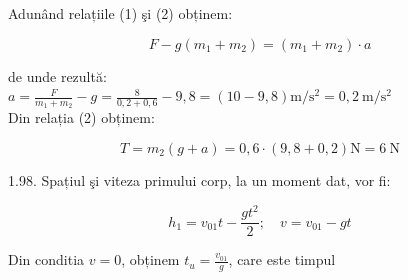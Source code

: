 \documentclass[10pt]{article}
\begin{document}
Adunând relațiile (1) şi (2) obținem:

$$
F-g\left(m_{1}+m_{2}\right)=\left(m_{1}+m_{2}\right) \cdot a
$$

de unde rezultă:\\
$a=\frac{F}{m_{1}+m_{2}}-g=\frac{8}{0,2+0,6}-9,8=(10-9,8) \mathrm{m} / \mathrm{s}^{2}=0,2 \mathrm{~m} / \mathrm{s}^{2}$\\
Din relația (2) obținem:

$$
T=m_{2}(g+a)=0,6 \cdot(9,8+0,2) \mathrm{N}=6 \mathrm{~N}
$$

1.98. Spațiul şi viteza primului corp, la un moment dat, vor fi:

$$
h_{1}=v_{01} t-\frac{g t^{2}}{2} ; \quad v=v_{01}-g t
$$

Din conditia $v=0$, obținem $t_{u}=\frac{v_{01}}{g}$, care este timpul\\
\end{document}
